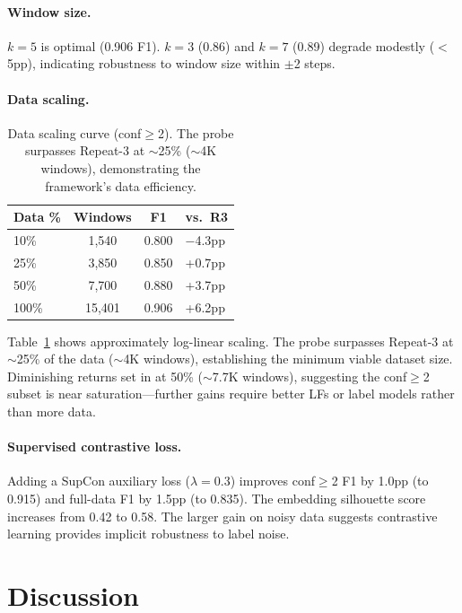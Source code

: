\documentclass[11pt]{article}
\begin{document}
\paragraph{Window size.}
$k{=}5$ is optimal (0.906 F1). $k{=}3$ (0.86) and $k{=}7$ (0.89) degrade modestly ($<$5pp), indicating robustness to window size within $\pm$2 steps.

\paragraph{Data scaling.}

\begin{table}[t]
\centering
\small
\begin{tabular}{lccl}
\toprule
\textbf{Data \%} & \textbf{Windows} & \textbf{F1} & \textbf{vs.\ R3} \\
\midrule
10\% & 1,540 & 0.800 & $-$4.3pp \\
25\% & 3,850 & 0.850 & +0.7pp \\
50\% & 7,700 & 0.880 & +3.7pp \\
100\% & 15,401 & 0.906 & +6.2pp \\
\bottomrule
\end{tabular}
\caption{Data scaling curve (conf$\geq$2). The probe surpasses Repeat-3 at $\sim$25\% ($\sim$4K windows), demonstrating the framework's data efficiency.}
\label{tab:scaling}
\end{table}

Table~\ref{tab:scaling} shows approximately log-linear scaling. The probe surpasses Repeat-3 at $\sim$25\% of the data ($\sim$4K windows), establishing the minimum viable dataset size. Diminishing returns set in at 50\% ($\sim$7.7K windows), suggesting the conf$\geq$2 subset is near saturation---further gains require better LFs or label models rather than more data.

\paragraph{Supervised contrastive loss.}
Adding a SupCon auxiliary loss ($\lambda{=}0.3$) improves conf$\geq$2 F1 by 1.0pp (to 0.915) and full-data F1 by 1.5pp (to 0.835). The embedding silhouette score increases from 0.42 to 0.58. The larger gain on noisy data suggests contrastive learning provides implicit robustness to label noise.

\section{Discussion}
\label{sec:discussion}
\end{document}
